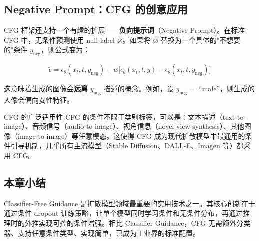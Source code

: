 \subsection{Negative Prompt：CFG 的创意应用}

CFG 框架还支持一个有趣的扩展——\textbf{负向提示词}（Negative Prompt）。在标准 CFG 中，无条件预测使用 null label $\varnothing$。如果将 $\varnothing$ 替换为一个具体的"不想要的"条件 $y_{\text{neg}}$，则公式变为：

$$
\tilde{\epsilon} = \epsilon_\theta(x_t, t, y_{\text{neg}}) + w\bigl[\epsilon_\theta(x_t, t, y) - \epsilon_\theta(x_t, t, y_{\text{neg}})\bigr]
$$

这意味着生成的图像会\textbf{远离} $y_{\text{neg}}$ 描述的概念。例如，设 $y_{\text{neg}} =$ ``male''，则生成的人像会偏向女性特征。

\begin{knowledgebox}{CFG 的广泛适用性}
CFG 的条件不限于类别标签，可以是：文本描述（text-to-image）、音频信号（audio-to-image）、视角信息（novel view synthesis）、其他图像（image-to-image）等任意模态。这使得 CFG 成为现代扩散模型中最通用的条件引导机制，几乎所有主流模型（Stable Diffusion、DALL-E、Imagen 等）都采用 CFG。
\end{knowledgebox}

\subsection{本章小结}

Classifier-Free Guidance 是扩散模型领域最重要的实用技术之一。其核心创新在于通过条件 dropout 训练策略，让单个模型同时学习条件和无条件分布，再通过推理时的外推实现可控的条件增强。相比 Classifier Guidance，CFG 无需额外分类器、支持任意条件类型、实现简单，已成为工业界的标准配置。

\newpage
